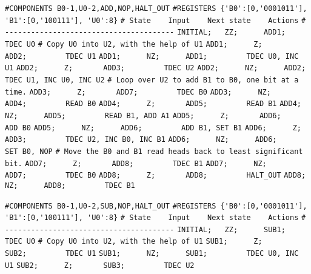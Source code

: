 \begin{apgsembly}
	\centering
	\begin{minipage}[t]{.49\textwidth}
		\begin{algorithmic}\tiny
			\State \verb|#COMPONENTS B0-1,U0-2,ADD,NOP,HALT_OUT|
			\State \verb|#REGISTERS {'B0':[0,'0001011'], 'B1':[0,'100111'], 'U0':8}|
			\State \verb|# State    Input    Next state    Actions|
			\State \verb|# ---------------------------------------|
			\State \verb|INITIAL;   ZZ;      ADD1;         TDEC U0|
			\State \verb||
			\State \verb|# Copy U0 into U2, with the help of U1|
			\State \verb|ADD1;      Z;       ADD2;         TDEC U1|
			\State \verb|ADD1;      NZ;      ADD1;         TDEC U0, INC U1|
			\State \verb|ADD2;      Z;       ADD3;         TDEC U2|
			\State \verb|ADD2;      NZ;      ADD2;         TDEC U1, INC U0, INC U2|
			\State \verb||
			\State \verb|# Loop over U2 to add B1 to B0, one bit at a time.|
			\State \verb|ADD3;      Z;       ADD7;         TDEC B0|
			\State \verb|ADD3;      NZ;      ADD4;         READ B0|
			\State \verb|ADD4;      Z;       ADD5;         READ B1|
			\State \verb|ADD4;      NZ;      ADD5;         READ B1, ADD A1|
			\State \verb|ADD5;      Z;       ADD6;         ADD B0|
			\State \verb|ADD5;      NZ;      ADD6;         ADD B1, SET B1|
			\State \verb|ADD6;      Z;       ADD3;         TDEC U2, INC B0, INC B1|
			\State \verb|ADD6;      NZ;      ADD6;         SET B0, NOP|
			\State \verb||
			\State \verb|# Move the B0 and B1 read heads back to least significant bit.|
			\State \verb|ADD7;      Z;       ADD8;         TDEC B1|
			\State \verb|ADD7;      NZ;      ADD7;         TDEC B0|
			\State \verb|ADD8;      Z;       ADD8;         HALT_OUT|
			\State \verb|ADD8;      NZ;      ADD8;         TDEC B1|
		\end{algorithmic}
	\end{minipage}\hfill{\color{gray}\vline}\hfill
	\begin{minipage}[t]{.49\textwidth}
		\begin{algorithmic}\tiny
			\State \verb|#COMPONENTS B0-1,U0-2,SUB,NOP,HALT_OUT|
			\State \verb|#REGISTERS {'B0':[0,'0001011'], 'B1':[0,'100111'], 'U0':8}|
			\State \verb|# State    Input    Next state    Actions|
			\State \verb|# ---------------------------------------|
			\State \verb|INITIAL;   ZZ;      SUB1;         TDEC U0|
			\State \verb||
			\State \verb|# Copy U0 into U2, with the help of U1|
			\State \verb|SUB1;      Z;       SUB2;         TDEC U1|
			\State \verb|SUB1;      NZ;      SUB1;         TDEC U0, INC U1|
			\State \verb|SUB2;      Z;       SUB3;         TDEC U2|

\end{algorithmic}
\end{minipage}
\end{apgsembly}
